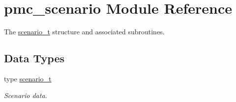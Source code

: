 \hypertarget{namespacepmc__scenario}{}\section{pmc\+\_\+scenario Module Reference}
\label{namespacepmc__scenario}


The \mbox{\hyperlink{structpmc__scenario_1_1scenario__t}{scenario\+\_\+t}} structure and associated subroutines.  


\subsection*{Data Types}
\begin{DoxyCompactItemize}
\item 
type \mbox{\hyperlink{structpmc__scenario_1_1scenario__t}{scenario\+\_\+t}}
\begin{DoxyCompactList}\small\item\em Scenario data. \end{DoxyCompactList}\end{DoxyCompactItemize}
